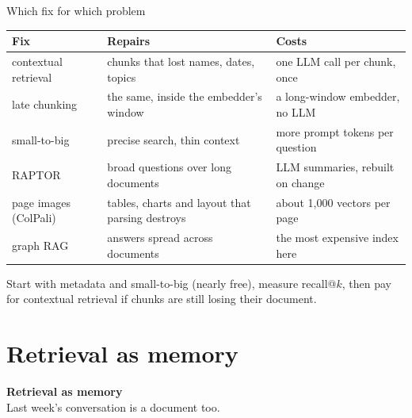 \documentclass[aspectratio=169]{beamer}
\newcommand{\takebox}[1]{%
  \begin{tcolorbox}[colback=paramgreen!8, colframe=paramgreen, boxrule=0.6pt, arc=2pt]
  #1
  \end{tcolorbox}}
\newcommand{\sectiontransition}[2]{%
  \begin{frame}[plain]
    \vfill
    \begin{center}
      {\Huge\bfseries\color{popblue} #1}\\[1.1em]
      {\large #2}
    \end{center}
    \vfill
  \end{frame}}
\begin{document}
\begin{frame}{Which fix for which problem}
  \vspace{0.1em}
  \begin{center}
  \footnotesize
  \begin{tabular}{>{\raggedright\arraybackslash}p{}>{\raggedright\arraybackslash}p{}>{\raggedright\arraybackslash}p{}}
    \toprule
    \textbf{Fix} & \textbf{Repairs} & \textbf{Costs} \\
    \midrule
    contextual retrieval & chunks that lost names, dates, topics & one LLM call per chunk, once \\
    late chunking & the same, inside the embedder's window & a long-window embedder, no LLM \\
    small-to-big & precise search, thin context & more prompt tokens per question \\
    RAPTOR & broad questions over long documents & LLM summaries, rebuilt on change \\
    page images (ColPali) & tables, charts and layout that parsing destroys & about 1{,}000 vectors per page \\
    graph RAG & answers spread across documents & the most expensive index here \\
    \bottomrule
  \end{tabular}
  \end{center}

  \vspace{0.4em}
  \takebox{\small Start with metadata and small-to-big (nearly free), measure recall@$k$, then pay
  for contextual retrieval if chunks are still losing their document.}
\end{frame}

\section{Retrieval as memory}
\sectiontransition{Retrieval as memory}{Last week's conversation is a document too.}
\end{document}
